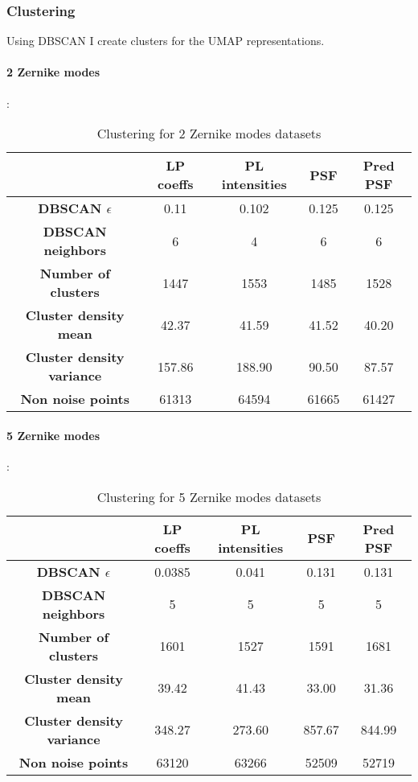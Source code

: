 	
	\subsubsection{Clustering}
		
		Using DBSCAN I create clusters for the UMAP representations.
		
		\paragraph{2 Zernike modes}:
		\begin{table}[h!]
			\centering
			\begin{tabular}{|c|c|c|c|c|}
				\hline
				\textbf{} & \textbf{LP coeffs} & \textbf{PL intensities} & \textbf{PSF} & \textbf{Pred PSF}\\
				\hline
				\textbf{DBSCAN $\epsilon$} & 0.11 & 0.102 & 0.125 & 0.125\\
				\hline
				\textbf{DBSCAN neighbors} & 6 & 4 & 6 & 6\\
				\hline
				\textbf{Number of clusters} & 1447 & 1553 & 1485 & 1528\\
				\hline
				\textbf{Cluster density mean} & 42.37 & 41.59 & 41.52 & 40.20\\
				\hline
				\textbf{Cluster density variance} & 157.86 & 188.90 & 90.50 & 87.57\\
				\hline
				\textbf{Non noise points} & 61313 & 64594 & 61665 & 61427\\
				\hline
			\end{tabular}
		\caption{Clustering for 2 Zernike modes datasets}
		\end{table}
		\FloatBarrier
		
		\paragraph{5 Zernike modes}:
		\begin{table}[h!]
			\centering
			\begin{tabular}{|c|c|c|c|c|}
				\hline
				\textbf{} & \textbf{LP coeffs} & \textbf{PL intensities} & \textbf{PSF} & \textbf{Pred PSF}\\
				\hline
				\textbf{DBSCAN $\epsilon$} & 0.0385 & 0.041 & 0.131 & 0.131\\
				\hline
				\textbf{DBSCAN neighbors} & 5 & 5 & 5 & 5\\
				\hline
				\textbf{Number of clusters} & 1601 & 1527 & 1591 & 1681\\
				\hline
				\textbf{Cluster density mean} & 39.42 & 41.43 & 33.00 & 31.36\\
				\hline
				\textbf{Cluster density variance} & 348.27 & 273.60 & 857.67 & 844.99\\
				\hline
				\textbf{Non noise points} & 63120 & 63266 & 52509 & 52719\\
				\hline
			\end{tabular}
		\caption{Clustering for 5 Zernike modes datasets}
		\end{table}
		\FloatBarrier
		
